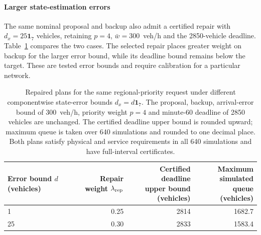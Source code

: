 \documentclass[final]{cas-sc}
\theoremstyle{definition}
\theoremstyle{plain}
\theoremstyle{definition}
\theoremstyle{plain}
\begin{document}
\paragraph{Larger state-estimation errors}
The same nominal proposal and backup also admit a certified repair with
$d_x=25\mathbf1_7$ vehicles, retaining $p=4$, $\bar w=300$~veh/h and
the 2850-vehicle deadline. Table~\ref{tab:repair-error-comparison}
compares the two cases. The selected repair places greater weight on
backup for the larger error bound, while its deadline bound remains below the
target. These are tested error bounds and require calibration for a
particular network.
\begin{table}[pos=!htb]
\centering\small
\caption{Repaired plans for the same regional-priority request under
different componentwise state-error bounds $d_x=d\mathbf1_7$. The
proposal, backup, arrival-error bound of 300~veh/h, priority weight
$p=4$ and minute-60 deadline of 2850 vehicles are unchanged.
The certified deadline upper bound is rounded upward; maximum queue
is taken over 640 simulations and rounded to one decimal place.
Both plans satisfy physical and service requirements in all 640
simulations and have full-interval certificates.}
\label{tab:repair-error-comparison}
\begin{tabularx}{\linewidth}{@{}Xrrr@{}}
\toprule
\shortstack{Error bound $d$\\(vehicles)} &
\shortstack{Repair weight\\$\lambda_{\rm rep}$} &
\shortstack{Certified deadline\\upper bound (vehicles)} &
\shortstack{Maximum simulated\\queue (vehicles)}\\
\midrule
1 & 0.25 & 2814 & 1682.7\\
25 & 0.30 & 2833 & 1583.4\\
\bottomrule
\end{tabularx}
\end{table}
\end{document}
